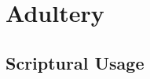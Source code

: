 \section{Adultery}
	\label{ADULTERY}
	





\subsection{Scriptural Usage} %
	\label{ADULTERY-SCRIPTURES}

	
	
